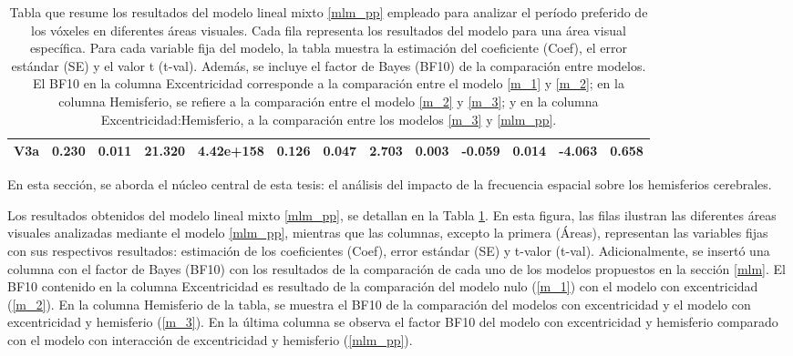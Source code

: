 \begin{table}[h]
{\begin{tabular}{@{}lcccccccccccc@{}}
		V3a & 0.230 & 0.011 & 21.320 & 4.42e+158 & 0.126 & 0.047 & 2.703 & 0.003 & -0.059 & 0.014 & -4.063 & 0.658 \\
		\bottomrule
	\end{tabular}
	\caption{Tabla que resume los resultados del modelo lineal mixto \ref{mlm_pp} empleado para analizar el per\'iodo preferido de los v\'oxeles en diferentes áreas visuales. Cada fila representa los resultados del modelo para una área visual específica. Para cada variable fija del modelo, la tabla muestra la estimación del coeficiente (Coef), el error estándar (SE) y el valor t (t-val). Además, se incluye el factor de Bayes (BF10) de la comparación entre modelos. El BF10 en la columna Excentricidad corresponde a la comparación entre el modelo \ref{m_1} y \ref{m_2}; en la columna Hemisferio, se refiere a la comparación entre el modelo \ref{m_2} y \ref{m_3}; y en la columna Excentricidad:Hemisferio, a la comparación entre los modelos \ref{m_3} y \ref{mlm_pp}.}
	\label{tab:mlm_results_pp}
}
\end{table}

En esta secci\'on, se aborda el núcleo central de esta tesis: el análisis del impacto de la frecuencia espacial sobre los hemisferios cerebrales. 

Los resultados obtenidos del modelo lineal mixto \ref{mlm_pp}, se detallan en la Tabla \ref{tab:mlm_results_pp}. En esta figura, las filas ilustran las diferentes áreas visuales analizadas mediante el modelo \ref{mlm_pp}, mientras que las columnas, excepto la primera (\'Areas), representan las variables fijas con sus respectivos resultados:  estimación de los coeficientes (Coef), error estándar (SE) y t-valor (t-val). Adicionalmente, se insert\'o una columna con el factor de Bayes (BF10) con los resultados de la comparaci\'on de cada uno de los modelos propuestos en la secci\'on \ref{mlm}. El BF10 contenido en la columna Excentricidad es resultado de la comparaci\'on del modelo nulo (\ref{m_1}) con el modelo con excentricidad (\ref{m_2}). En la columna Hemisferio de la tabla, se muestra el BF10 de la comparaci\'on del modelos con excentricidad  y el modelo con excentricidad y hemisferio (\ref{m_3}). En la \'ultima columna se observa el factor BF10 del modelo con excentricidad y hemisferio comparado con el modelo con interacci\'on de excentricidad y hemisferio (\ref{mlm_pp}).


